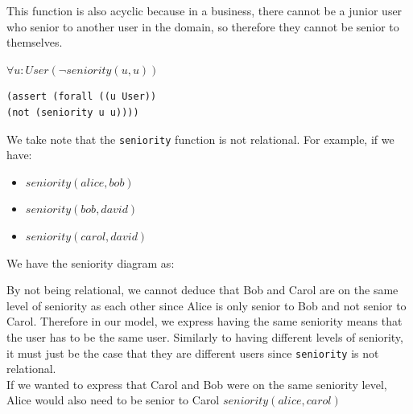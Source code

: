 \documentclass[a4paper]{report}
\begin{document}
This function is also acyclic because in a business, there cannot be a junior user who senior to another user in the domain, so therefore they cannot be senior to themselves.
\begin{center}
$\forall u : User (\neg seniority(u, u))$
\end{center}
\begin{lstlisting}[frame=single]
(assert (forall ((u User))
(not (seniority u u))))
\end{lstlisting}

We take note that the \texttt{seniority} function is not relational. For example, if we have:
\begin{itemize}
\item $seniority(alice, bob)$
\item $seniority(bob, david)$
\item $seniority(carol, david)$
\end{itemize}
We have the seniority diagram as:
\begin{figure}[!h]
\center
{}
\end{figure}

By not being relational, we cannot deduce that Bob and Carol are on the same level of seniority as each other since Alice is only senior to Bob and not senior to Carol. Therefore in our model, we express having the same seniority means that the user has to be the same user. Similarly to having different levels of seniority, it must just be the case that they are different users since \texttt{seniority} is not relational.\\

If we wanted to express that Carol and Bob were on the same seniority level, Alice would also need to be senior to Carol $seniority(alice, carol)$
\begin{center}
\end{center}
\end{document}
